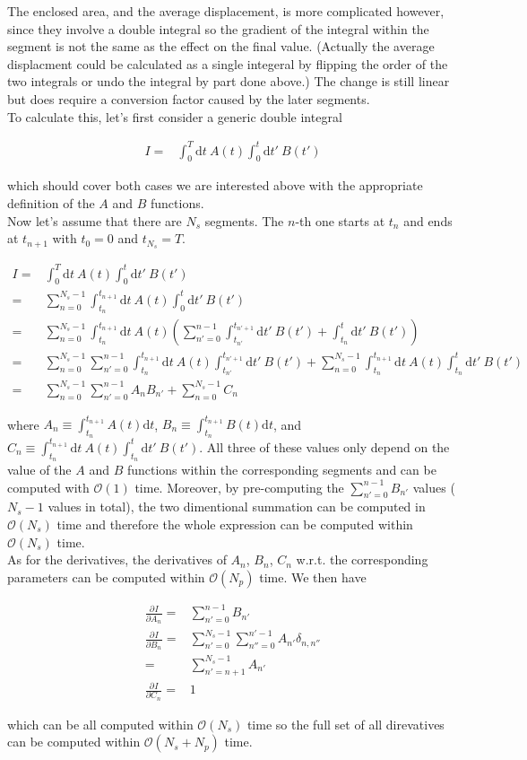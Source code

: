 \documentclass[10pt,fleqn]{article}
\newcommand{\ud}{\mathrm{d}}
\newcommand{\dsum}{\displaystyle\sum}
\newcommand{\dint}{\displaystyle\int}
\newcommand{\eqar}[1]
{
  \begin{align*}
    #1
  \end{align*}
}
\newcommand{\paren}[1]{{\left({#1}\right)}}
\newcommand{\pdiff}[3][{}]{{\frac{\partial^{#1} {#2}}{\partial {#3}{}^{#1}}}}
\begin{document}
The enclosed area, and the average displacement, is more complicated however,
since they involve a double integral so the gradient of the integral
within the segment is not the same as the effect on the final value.
(Actually the average displacment could be calculated as a single integeral
by flipping the order of the two integrals or undo the integral by part
done above.) The change is still linear but does require a conversion factor
caused by the later segments.\\

To calculate this, let's first consider a generic double integral
\eqar{
  I=&\int_0^T\!\!\ud t\ A(t)\int_0^t\!\!\ud t'\ B(t')
}
which should cover both cases we are interested above
with the appropriate definition of the $A$ and $B$ functions.\\

Now let's assume that there are $N_s$ segments. The $n$-th one starts
at $t_{n}$ and ends at $t_{n+1}$ with $t_0=0$ and $t_{N_s}=T$.
\eqar{
  I=&\int_0^T\!\!\ud t\ A(t)\int_0^t\!\!\ud t'\ B(t')\\
  =&\sum_{n=0}^{N_s-1}\int_{t_{n}}^{t_{n+1}}\!\!\ud t\ A(t)\int_0^t\!\!\ud t'\ B(t')\\
  =&\sum_{n=0}^{N_s-1}\int_{t_{n}}^{t_{n+1}}\!\!\ud t\ A(t)
  \paren{\sum_{n'=0}^{n-1}\int_{t_{n'}}^{t_{n'+1}}\!\!\ud t'\ B(t')+\int_{t_n}^{t}\!\!\ud t'\ B(t')}\\
  =&\sum_{n=0}^{N_s-1}\sum_{n'=0}^{n-1}\int_{t_{n}}^{t_{n+1}}\!\!\ud t\ A(t)
  \int_{t_{n'}}^{t_{n'+1}}\!\!\ud t'\ B(t')+\sum_{n=0}^{N_s-1}\int_{t_{n}}^{t_{n+1}}\!\!\ud t\ A(t)\int_{t_n}^{t}\!\!\ud t'\ B(t')\\
  =&\sum_{n=0}^{N_s-1}\sum_{n'=0}^{n-1}A_{n}B_{n'}+\sum_{n=0}^{N_s-1}C_n
}
where $A_n\equiv\dint_{t_n}^{t_{n+1}}A(t)\ud t$, $B_n\equiv\dint_{t_n}^{t_{n+1}}B(t)\ud t$,
and $C_n\equiv\dint_{t_{n}}^{t_{n+1}}\!\!\ud t\ A(t)\dint_{t_n}^{t}\!\!\ud t'\ B(t')$.
All three of these values only depend on the value of the $A$ and $B$ functions
within the corresponding segments and can be computed with $\mathcal{O}(1)$ time.
Moreover, by pre-computing the $\dsum_{n'=0}^{n-1}B_{n'}$ values ($N_s-1$ values in total),
the two dimentional summation can be computed in $\mathcal{O}(N_s)$ time
and therefore the whole expression can be computed within $\mathcal{O}(N_s)$ time.\\

As for the derivatives, the derivatives of $A_n$, $B_n$, $C_n$ w.r.t.
the corresponding parameters can be computed within $\mathcal{O}(N_p)$ time.
We then have
\eqar{
  \pdiff{I}{A_n}=&\sum_{n'=0}^{n-1}B_{n'}\\
  \pdiff{I}{B_n}=&\sum_{n'=0}^{N_s-1}\sum_{n''=0}^{n'-1}A_{n'}\delta_{n,n''}\\
  =&\sum_{n'=n+1}^{N_s-1}A_{n'}\\
  \pdiff{I}{C_n}=&1
}
which can be all computed within $\mathcal{O}(N_s)$ time so the full set of
all direvatives can be computed within $\mathcal{O}(N_s+N_p)$ time.
\end{document}
